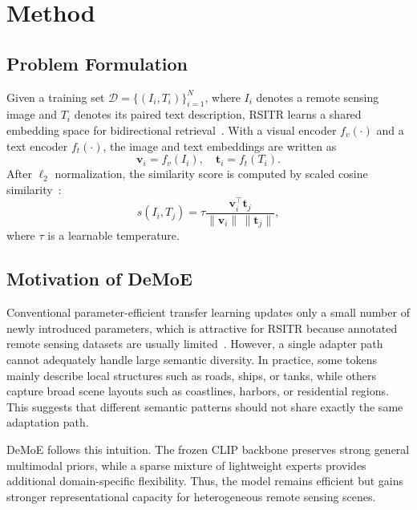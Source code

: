 \documentclass[conference]{IEEEtran}
\begin{document}
\section{Method}
\subsection{Problem Formulation}
Given a training set $\mathcal{D}=\{(I_i,T_i)\}_{i=1}^{N}$, where $I_i$ denotes a remote sensing image and $T_i$ denotes its paired text description, RSITR learns a shared embedding space for bidirectional retrieval~\cite{ref1,ref4}. With a visual encoder $f_v(\cdot)$ and a text encoder $f_t(\cdot)$, the image and text embeddings are written as
\begin{equation}
\mathbf{v}_i=f_v(I_i), \quad \mathbf{t}_i=f_t(T_i).
\end{equation}
After $\ell_2$ normalization, the similarity score is computed by scaled cosine similarity~\cite{ref3}:
\begin{equation}
 s(I_i,T_j)=\tau\frac{\mathbf{v}_i^{\top}\mathbf{t}_j}{\|\mathbf{v}_i\|\,\|\mathbf{t}_j\|},
\end{equation}
where $\tau$ is a learnable temperature.

\subsection{Motivation of DeMoE}
Conventional parameter-efficient transfer learning updates only a small number of newly introduced parameters, which is attractive for RSITR because annotated remote sensing datasets are usually limited~\cite{ref7}. However, a single adapter path cannot adequately handle large semantic diversity. In practice, some tokens mainly describe local structures such as roads, ships, or tanks, while others capture broad scene layouts such as coastlines, harbors, or residential regions. This suggests that different semantic patterns should not share exactly the same adaptation path.

DeMoE follows this intuition. The frozen CLIP backbone preserves strong general multimodal priors, while a sparse mixture of lightweight experts provides additional domain-specific flexibility. Thus, the model remains efficient but gains stronger representational capacity for heterogeneous remote sensing scenes.
\end{document}
